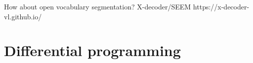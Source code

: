 \documentclass{article}
\begin{document}
How about open vocabulary segmentation? X-decoder/SEEM
https://x-decoder-vl.github.io/

\section*{Differential programming}
\end{document}

